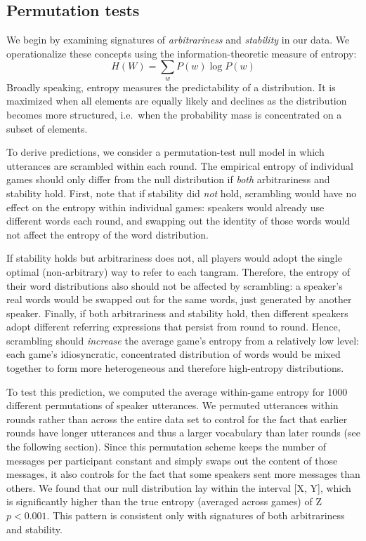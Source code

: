 \documentclass[alpha-refs]{wiley-article}
\begin{document}
\subsection{Permutation tests}\label{arbitrariness-and-stability}

We begin by examining signatures of \emph{arbitrariness} and
\emph{stability} in our data. We operationalize these concepts using the
information-theoretic measure of entropy:
\[H(W) = \sum_w P(w) \log P(w)\] Broadly speaking, entropy measures the
predictability of a distribution. It is maximized when all elements are
equally likely and declines as the distribution becomes more structured,
i.e.~when the probability mass is concentrated on a subset of elements.

To derive predictions, we consider a permutation-test null model in
which utterances are scrambled within each round. The empirical entropy
of individual games should only differ from the null distribution if
\emph{both} arbitrariness and stability hold. First, note that if
stability did \emph{not} hold, scrambling would have no effect on the
entropy within individual games: speakers would already use different
words each round, and swapping out the identity of those words would not
affect the entropy of the word distribution.

If stability holds but arbitrariness does not, all players would adopt
the single optimal (non-arbitrary) way to refer to each tangram.
Therefore, the entropy of their word distributions also should not be
affected by scrambling: a speaker's real words would be swapped out for
the same words, just generated by another speaker. Finally, if both
arbitrariness and stability hold, then different speakers adopt
different referring expressions that persist from round to round. Hence,
scrambling should \emph{increase} the average game's entropy from a
relatively low level: each game's idiosyncratic, concentrated
distribution of words would be mixed together to form more heterogeneous
and therefore high-entropy distributions.

To test this prediction, we computed the average within-game entropy for
1000 different permutations of speaker utterances. We permuted
utterances within rounds rather than across the entire data set to
control for the fact that earlier rounds have longer utterances and thus
a larger vocabulary than later rounds (see the following section). Since
this permutation scheme keeps the number of messages per participant
constant and simply swaps out the content of those messages, it also
controls for the fact that some speakers sent more messages than others.
We found that our null distribution lay within the interval {[}X, Y{]},
which is significantly higher than the true entropy (averaged across
games) of Z \(p < 0.001\). This pattern is consistent only with
signatures of both arbitrariness and stability.
\end{document}
